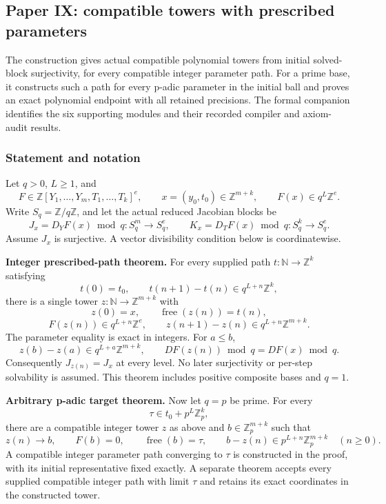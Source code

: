 \hypertarget{cont9:paper-ix-compatible-towers-with-prescribed-parameters}{%
\subsection{Paper IX: compatible towers with prescribed
parameters}\label{cont9:paper-ix-compatible-towers-with-prescribed-parameters}}

The construction gives actual compatible polynomial towers from initial
solved-block surjectivity, for every compatible integer parameter path.
For a prime base, it constructs such a path for every p-adic parameter
in the initial ball and proves an exact polynomial endpoint with all
retained precisions. The formal companion identifies the six supporting modules and their
recorded compiler and axiom-audit results.

\hypertarget{cont9:statement-and-notation}{%
\subsubsection{Statement and notation}\label{cont9:statement-and-notation}}

Let \(q>0\), \(L\ge1\), and \[
F\in\mathbb Z[Y_1,\ldots,Y_m,T_1,\ldots,T_k]^e,
\qquad x=(y_0,t_0)\in\mathbb Z^{m+k},
\qquad F(x)\in q^L\mathbb Z^e.
\] Write \(S_q=\mathbb Z/q\mathbb Z\), and let the actual reduced
Jacobian blocks be \[
J_x=D_YF(x)\bmod q:S_q^m\longrightarrow S_q^e,
\qquad K_x=D_TF(x)\bmod q:S_q^k\longrightarrow S_q^e.
\] Assume \(J_x\) is surjective. A vector divisibility condition below
is coordinatewise.

\textbf{Integer prescribed-path theorem.} For every supplied path
\(t:\mathbb N\to\mathbb Z^k\) satisfying \[
t(0)=t_0,\qquad t(n+1)-t(n)\in q^{L+n}\mathbb Z^k,
\] there is a single tower \(z:\mathbb N\to\mathbb Z^{m+k}\) with \[
z(0)=x,\qquad \operatorname{free}(z(n))=t(n),
\] \[
F(z(n))\in q^{L+n}\mathbb Z^e,\qquad
z(n+1)-z(n)\in q^{L+n}\mathbb Z^{m+k}.
\] The parameter equality is exact in integers. For \(a\le b\), \[
z(b)-z(a)\in q^{L+a}\mathbb Z^{m+k},\qquad
DF(z(n))\bmod q=DF(x)\bmod q.
\] Consequently \(J_{z(n)}=J_x\) at every level. No later surjectivity
or per-step solvability is assumed. This theorem includes positive
composite bases and \(q=1\).

\textbf{Arbitrary p-adic target theorem.} Now let \(q=p\) be prime. For
every \[
\tau\in t_0+p^L\mathbb Z_p^k,
\] there are a compatible integer tower \(z\) as above and
\(b\in\mathbb Z_p^{m+k}\) such that \[
z(n)\longrightarrow b,\qquad F(b)=0,\qquad
\operatorname{free}(b)=\tau,
\qquad b-z(n)\in p^{L+n}\mathbb Z_p^{m+k}\quad(n\ge0).
\] A compatible integer parameter path converging to \(\tau\) is
constructed in the proof, with its initial representative fixed exactly.
A separate theorem accepts every supplied compatible integer path with
limit \(\tau\) and retains its exact coordinates in the constructed
tower.

